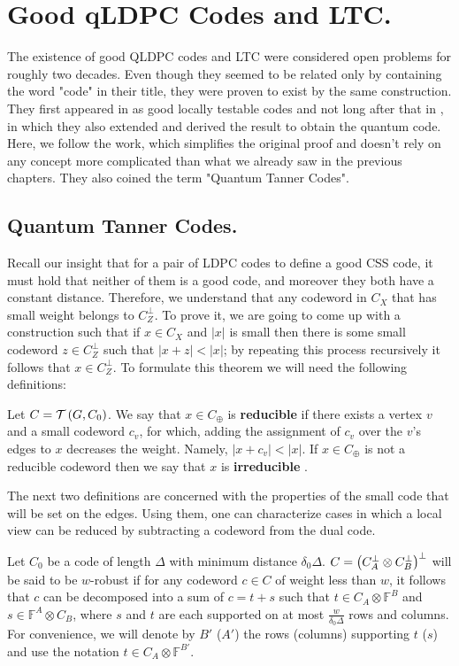 \chapter{Good qLDPC Codes and LTC.}

The existence of good QLDPC codes and LTC were considered open problems for roughly two decades. Even though they seemed to be related only by containing the word "code" in their title, they were proven to exist by the same construction. They first appeared in \cite{Dinur} as good locally testable codes and not long after that in \cite{Pavel}, in which they also extended and derived the result to obtain the quantum code. Here, we follow the \cite{leverrier2022quantum} work, which simplifies the original proof and doesn't rely on any concept more complicated than what we already saw in the previous chapters. They also coined the term "Quantum Tanner Codes".


\section{Quantum Tanner Codes.}
Recall our insight that for a pair of LDPC codes to define a good CSS code, it must hold that neither of them is a good code, and moreover they both have a constant distance. Therefore, we understand that any codeword in $C_{X}$ that has small weight belongs to $C_{Z}^\perp$. To prove it, we are going to come up with a construction such that if $x \in C_{X}$ and $|x|$ is small then there is some small codeword $z \in C_{Z}^{\perp}$ such that $|x+z| < |x|$; by repeating this process recursively it follows that $x\in C_{Z}^{\perp}$. To formulate this theorem we will need the following definitions:
  
  \begin{definition} Let $C = \mathcal{T}\left( G, C_0 \right)$. We say that $x \in C_{\oplus}$ is \textbf{reducible} if there exists a vertex $v$ and a small codeword $c_v$, for which, adding the assignment of $c_v$ over the $v$'s edges to $x$ decreases the weight. Namely, $|x + c_{v}| < |x|$. If $x \in C_{\oplus}$ is not a reducible codeword then we say that $x$ is \textbf{irreducible} \label{ire}. \end{definition}

The next two definitions are concerned with the properties of the small code that will be set on the edges. Using them, one can characterize cases in which a local view can be reduced by subtracting a codeword from the dual code.

\begin{definition}[$w$-Robustness] 
  \label{def:wrobust}
Let $C_0$ be a code of length $\Delta$ with minimum distance $\delta_0\Delta$. $C = \left( C_{A}^{\perp}\otimes C_{B}^{\perp} \right)^{\perp} $ will be said to be $w$-robust if for any codeword $c \in C$ of weight less than $w$, it follows that $c$ can be decomposed into a sum of $c = t + s$ such that $t \in C_A \otimes \mathbb{F}^{B}$ and $s \in \mathbb{F}^A \otimes C_B$, where $s$ and $t$ are each supported on at most $\frac{w}{\delta_0\Delta}$ rows and columns. For convenience, we will denote by $B'$ ($A'$) the rows (columns) supporting $t$ ($s$) and use the notation $t \in C_A \otimes \mathbb{F}^{B'}$.
\end{definition}

